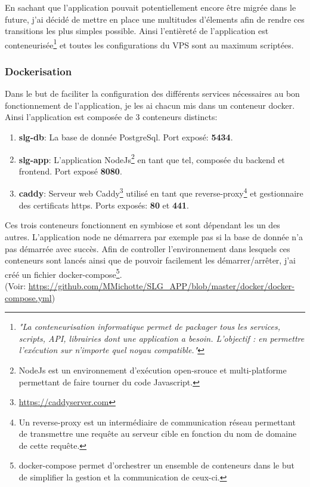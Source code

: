\newpara

En sachant que l'application pouvait potentiellement encore être migrée dans le future, j'ai décidé de mettre en place une multitudes d'élements afin de rendre ces transitions les plus simples possible. Ainsi l'entièreté de l'application est conteneurisée\footnote{\textit{"La conteneurisation informatique permet de packager tous les services, scripts, API, librairies dont une application a besoin. L’objectif : en permettre l’exécution sur n’importe quel noyau compatible."}\cite{conteneurisation}} et toutes les configurations du VPS sont au maximum scriptées. 

\subsubsection{Dockerisation}
Dans le but de faciliter la configuration des différents services nécessaires au bon fonctionnement de l'application, je les ai chacun mis dans un conteneur docker. Ainsi l'application est composée de 3 conteneurs distincts: 

\newpara

\begin{enumerate}
  \item \textbf{slg-db}: La base de donnée PostgreSql. Port exposé: \textbf{5434}.
  \item \textbf{slg-app}: L'application NodeJs\footnote{NodeJs est un environnement d'exécution open-srouce et multi-platforme permettant de faire tourner du code Javascript.} en tant que tel, composée du backend et frontend. Port exposé \textbf{8080}. 
  \item \textbf{caddy}: Serveur web Caddy\footnote{\url{https://caddyserver.com}} utilisé en tant que reverse-proxy\footnote{Un reverse-proxy est un intermédiaire de communication réseau permettant de transmettre une requête au serveur cible en fonction du nom de domaine de cette requête.} et gestionnaire des certificats https. Ports exposés: \textbf{80} et \textbf{441}.
\end{enumerate}

\newpage

Ces trois conteneurs fonctionnent en symbiose et sont dépendant les un des autres. L'application node ne démarrera par exemple pas si la base de donnée n'a pas démarrée avec succès. Afin de controller l'environnement dans lesquels ces conteneurs sont lancés ainsi que de pouvoir facilement les démarrer/arrêter, j'ai créé un fichier docker-compose\footnote{docker-compose permet d'orchestrer un ensemble de conteneurs dans le but de simplifier la gestion et la communication de ceux-ci.}. \\ (Voir: \url{https://github.com/MMichotte/SLG_APP/blob/master/docker/docker-compose.yml})

